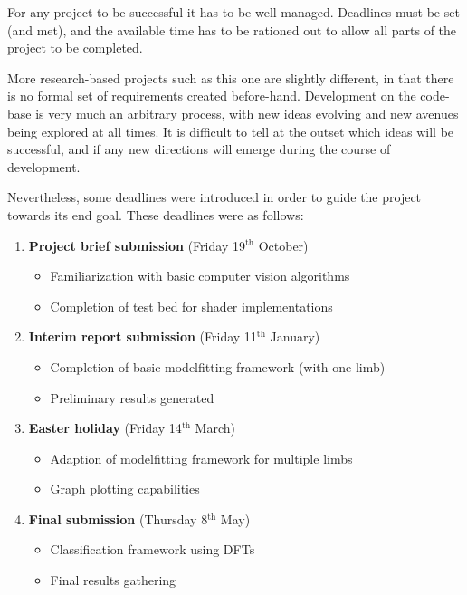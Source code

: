 For any project to be successful it has to be well managed.
Deadlines must be set (and met), and the available time has to be rationed out to allow all parts of the project to be completed.

More research-based projects such as this one are slightly different, in that there is no formal set of requirements created before-hand.
Development on the code-base is very much an arbitrary process, with new ideas evolving and new avenues being explored at all times.
It is difficult to tell at the outset which ideas will be successful, and if any new directions will emerge during the course of development.

Nevertheless, some deadlines were introduced in order to guide the project towards its end goal.
These deadlines were as follows:

\begin{enumerate}
	\item \textbf{Project brief submission} (Friday 19$^\text{th}$ October)
	\begin{itemize}
		\item Familiarization with basic computer vision algorithms
		\item Completion of test bed for shader implementations
	\end{itemize}
	
	\item \textbf{Interim report submission} (Friday 11$^\text{th}$ January)
	\begin{itemize}
		\item Completion of basic modelfitting framework (with one limb)
		\item Preliminary results generated
	\end{itemize}
	
	\item \textbf{Easter holiday} (Friday 14$^\text{th}$ March)
	\begin{itemize}
		\item Adaption of modelfitting framework for multiple limbs
		\item Graph plotting capabilities
	\end{itemize}
	
	\item \textbf{Final submission} (Thursday 8$^\text{th}$ May)
	\begin{itemize}
		\item Classification framework using DFTs
		\item Final results gathering
	\end{itemize}
\end{enumerate}

